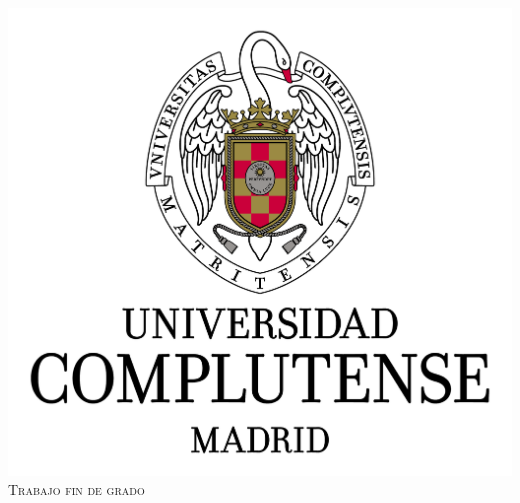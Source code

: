 	
	\begin{titlepage}
		
		\newcommand{\HRule}{\rule{\linewidth}{0.25mm}} %
		
		\center %
		

		
		\includegraphics{images/ucmLogo.png}\\[1cm] %
		
		\textsc{\Large Trabajo fin de grado}\\[0.5cm] 
		
		

\end{titlepage}
